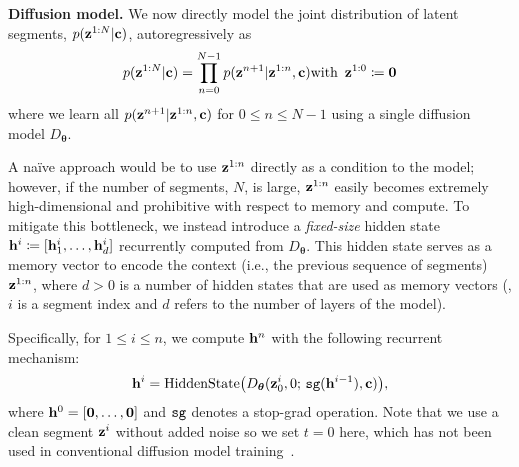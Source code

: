 \vspace{0.02in}
\noindent\textbf{Diffusion model.}
We now directly model the joint distribution of latent segments,  $p(\mathbf{z}^{1:N}|\mathbf{c})$, autoregressively as 
\begin{align}
p (\mathbf{z}^{1:N} | \mathbf{c}) = \prod_{n=0}^{N-1} p(\mathbf{z}^{n+1} | \mathbf{z}^{1:n}, \mathbf{c}) \text{with}\,\,\, \mathbf{z}^{1:0}\coloneqq \mathbf{0}
\end{align}
where we learn all 
$p(\mathbf{z}^{n+1} | \mathbf{z}^{1:n}, \mathbf{c})$ for $0\leq n \leq N-1$ using a single diffusion model $D_{\bm{\theta}}$.

A na\"ive approach would be to use $\mathbf{z}^{1:n}$ directly as a condition to the model; however, if the number of segments, $N$, is large, $\mathbf{z}^{1:n}$ easily becomes extremely high-dimensional and prohibitive with respect to memory and compute. To mitigate this bottleneck, we instead introduce a \emph {fixed-size} hidden state $\mathbf{h}^{i} \coloneqq [\mathbf{h}^{i}_1, \ldots, \mathbf{h}^{i}_{d}]$ recurrently computed from $D_{\bm{\theta}}$. This hidden state serves as a memory vector to encode the context (i.e., the previous sequence of segments) $\mathbf{z}^{1:n}$, where $d>0$ is a number of hidden states that are used as memory vectors (\ie, $i$ is a segment index and $d$ refers to the number of layers of the model). 

Specifically, for $1 \leq i \leq n$, we compute $\mathbf{h}^n$ with the following recurrent mechanism:
\begin{equation}
    \mathbf{h}^{i} = \mathrm{HiddenState}\big(D_{\bm{\theta}} (\mathbf{z}_0^{i}, 0;\, \small{\mathtt{sg}}(\mathbf{h}^{i-1}), \mathbf{c})\big),
\end{equation}
where $\mathbf{h}^{0} = [\mathbf{0}, \ldots, \mathbf{0}]$ and $\small{\mathtt{sg}}$ denotes a stop-grad operation.
Note that we use a clean segment $\mathbf{z}^{i}$ without added noise so we set $t=0$ here, which has not been used in conventional diffusion model training~\citep{ho2021denoising,song2021denoising,song2021scorebased}.



